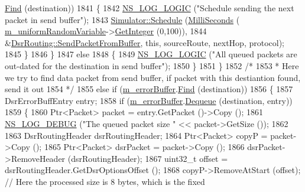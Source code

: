 \begin{DoxyCode}
      \hyperlink{classns3_1_1dsr_1_1DsrSendBuffer_acf27d9e92a1d1960b9094c4108724a53}{Find} (destination))
1841             \{
1842               \hyperlink{group__logging_ga88acd260151caf2db9c0fc84997f45ce}{NS\_LOG\_LOGIC} (\textcolor{stringliteral}{"Schedule sending the next packet in send buffer"});
1843               \hyperlink{classns3_1_1Simulator_a671882c894a08af4a5e91181bf1eec13}{Simulator::Schedule} (\hyperlink{group__timecivil_gaf26127cf4571146b83a92ee18679c7a9}{MilliSeconds} (
      \hyperlink{classns3_1_1dsr_1_1DsrRouting_a22a85b3510166ffdd451e4010f996f0f}{m\_uniformRandomVariable}->\hyperlink{classns3_1_1RandomVariableStream_a66cd94e6305ce7f000f1a9ff0fcb9aef}{GetInteger} (0,100)),
1844                                    &\hyperlink{classns3_1_1dsr_1_1DsrRouting_a1a862a16f3a5527f9425763864ac3e80}{DsrRouting::SendPacketFromBuffer}, \textcolor{keyword}{this},
       sourceRoute, nextHop, protocol);
1845             \}
1846         \}
1847       \textcolor{keywordflow}{else}
1848         \{
1849           \hyperlink{group__logging_ga88acd260151caf2db9c0fc84997f45ce}{NS\_LOG\_LOGIC} (\textcolor{stringliteral}{"All queued packets are out-dated for the destination in send buffer"});
1850         \}
1851     \}
1852   \textcolor{comment}{/*}
1853 \textcolor{comment}{   * Here we try to find data packet from send buffer, if packet with this destiantion found, send it out}
1854 \textcolor{comment}{   */}
1855   \textcolor{keywordflow}{else} \textcolor{keywordflow}{if} (\hyperlink{classns3_1_1dsr_1_1DsrRouting_a802e15bf588fd1e9ccd401221461397a}{m\_errorBuffer}.\hyperlink{classns3_1_1dsr_1_1DsrErrorBuffer_a6297a3549b5a22b7a71f7ffe44323b0e}{Find} (destination))
1856     \{
1857       DsrErrorBuffEntry entry;
1858       \textcolor{keywordflow}{if} (\hyperlink{classns3_1_1dsr_1_1DsrRouting_a802e15bf588fd1e9ccd401221461397a}{m\_errorBuffer}.\hyperlink{classns3_1_1dsr_1_1DsrErrorBuffer_a58e0c804871e9834661054edaa8f3f21}{Dequeue} (destination, entry))
1859         \{
1860           Ptr<Packet> packet = entry.GetPacket ()->Copy ();
1861           \hyperlink{group__logging_ga413f1886406d49f59a6a0a89b77b4d0a}{NS\_LOG\_DEBUG} (\textcolor{stringliteral}{"The queued packet size "} << packet->GetSize ());
1862 
1863           DsrRoutingHeader dsrRoutingHeader;
1864           Ptr<Packet> copyP = packet->Copy ();
1865           Ptr<Packet> dsrPacket = packet->Copy ();
1866           dsrPacket->RemoveHeader (dsrRoutingHeader);
1867           uint32\_t offset = dsrRoutingHeader.GetDsrOptionsOffset ();
1868           copyP->RemoveAtStart (offset);       \textcolor{comment}{// Here the processed size is 8 bytes, which is the fixed
}
\end{DoxyCode}
